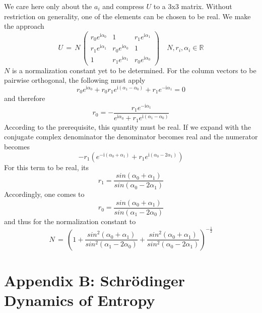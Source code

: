 \documentclass[12pt]{article}
\begin{document}
We care here only about the $a_i$ and compress $U$ to a 3x3 matrix. Without restriction on generality, one of the elements can be chosen to be real. We make the approach
\begin{equation*}
U\, =\, N \, 
\begin{pmatrix}
r_0 e^{\mathrm i\alpha_0} & 1 & r_1 e^{\mathrm i\alpha_1} \\
r_1 e^{\mathrm i\alpha_1} & r_0 e^{\mathrm i\alpha_0} & 1 \\
1 & r_1 e^{\mathrm i\alpha_1} & r_0 e^{\mathrm i\alpha_0}
\end{pmatrix}
\quad N, r_i, \alpha_i \in \mathbb{R}
\end{equation*}
$N$ is a normalization constant yet to be determined. For the column vectors to be pairwise orthogonal, the following must apply
\begin{equation*}
r_0 e^{\mathrm  i\alpha_0} + r_0 r_1 e^{\mathrm i(\alpha_1 - \alpha_0)} + r_1 e^{- \mathrm  i\alpha_1} = 0
\end{equation*}
and therefore 
\begin{equation*}
r_0 = - \frac{r_1 e^{-\mathrm i\alpha_1}}{ e^{\mathrm i\alpha_0} + r_1 e^{\mathrm i(\alpha_1 - \alpha_0)} }
\end{equation*}
According to the prerequisite, this quantity must be real. If we expand with the conjugate complex denominator the denominator becomes real and the numerator becomes
\begin{equation*}
-r_1 \left( e^{-\mathrm i(\alpha_0+\alpha_1)} + r_1 e^{\mathrm i(\alpha_0-2\alpha_1)} \right)
\end{equation*}
For this term to be real, its
\begin{equation*}
r_1=\frac{sin(\alpha_0+\alpha_1)}{sin(\alpha_0-2\alpha_1)}
\end{equation*}
Accordingly, one comes to 
\begin{equation*}
r_0=\frac{sin(\alpha_0+\alpha_1)}{sin(\alpha_1-2\alpha_0)}
\end{equation*}
and thus for the normalization constant to 
\begin{equation*}
N\, = \, \left( 1 +
\frac{sin^2(\alpha_0+\alpha_1)}{sin^2(\alpha_1-2\alpha_0)} +
\frac{sin^2(\alpha_0+\alpha_1)}{sin^2(\alpha_0-2\alpha_1)} \right)^{-\frac{1}{2}}
\end{equation*}

\section{Appendix B: Schrödinger Dynamics of Entropy}
\end{document}
